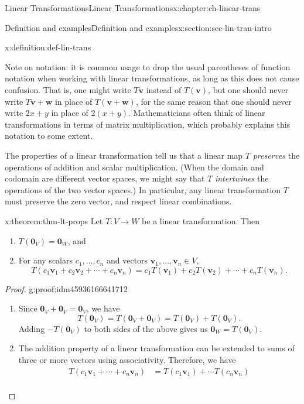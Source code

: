 \documentclass[oneside,10pt,]{book}
\numberwithin{equation}{section}
\newcommand{\vv}{\mathbf{v}}
\newcommand{\ww}{\mathbf{w}}
\newcommand{\amp}{&}
\begin{document}
\begin{chapterptx}{Linear Transformations}{}{Linear Transformations}{}{}{x:chapter:ch-linear-trans}
\begin{sectionptx}{Definition and examples}{}{Definition and examples}{}{}{x:section:sec-lin-tran-intro}
\begin{definition}{}{x:definition:def-lin-trans}
\end{definition}
Note on notation: it is common usage to drop the usual parentheses of function notation when working with linear transformations, as long as this does not cause confusion. That is, one might write \(T\vv\) instead of \(T(\vv)\), but one should never write \(T\vv+\ww\) in place of \(T(\vv+\ww)\), for the same reason that one should never write \(2x+y\) in place of \(2(x+y)\). Mathematicians often think of linear transformations in terms of matrix multiplication, which probably explains this notation to some extent.%
\par
The properties of a linear transformation tell us that a linear map \(T\) \emph{preserves} the operations of addition and scalar multiplication. (When the domain and codomain are different vector spaces, we might say that \(T\) \emph{intertwines} the operations of the two vector spaces.) In particular, any linear transformation \(T\) must preserve the zero vector, and respect linear combinations.%
\begin{theorem}{}{}{x:theorem:thm-lt-props}%
Let \(T:V\to W\) be a linear transformation. Then%
\begin{enumerate}
\item{}\(T(\mathbf{0}_V) = \mathbf{0}_W\), and%
\item{}For any scalars \(c_1,\ldots, c_n\) and vectors \(\vv_1,\ldots, \vv_n\in V\),%
\begin{equation*}
T(c_1\vv_1+c_2\vv_2+\cdots + c_n\vv_n) = c_1T(\vv_1)+c_2T(\vv_2)+\cdots + c_nT(\vv_n)\text{.}
\end{equation*}
%
\end{enumerate}
%
\end{theorem}
\begin{proof}{}{g:proof:idm45936166641712}
%
\begin{enumerate}
\item{}Since \(\mathbf{0}_V+\mathbf{0}_V = \mathbf{0}_V\), we have%
\begin{equation*}
T(\mathbf{0}_V) = T(\mathbf{0}_V+\mathbf{0}_V) = T(\mathbf{0}_V)+T(\mathbf{0}_V)\text{.}
\end{equation*}
Adding \(-T(\mathbf{0}_V)\) to both sides of the above gives us \(\mathbf{0}_W = T(\mathbf{0}_V)\).%
\item{}The addition property of a linear transformation can be extended to sums of three or more vectors using associativity. Therefore, we have%
\begin{align*}
T(c_1\vv_1+\cdots + c_n\vv_n) \amp = T(c_1\vv_1)+ \cdots T(c_n\vv_n)\\

\end{align*}
\end{enumerate}
\end{proof}
\end{sectionptx}
\end{chapterptx}
\end{document}
